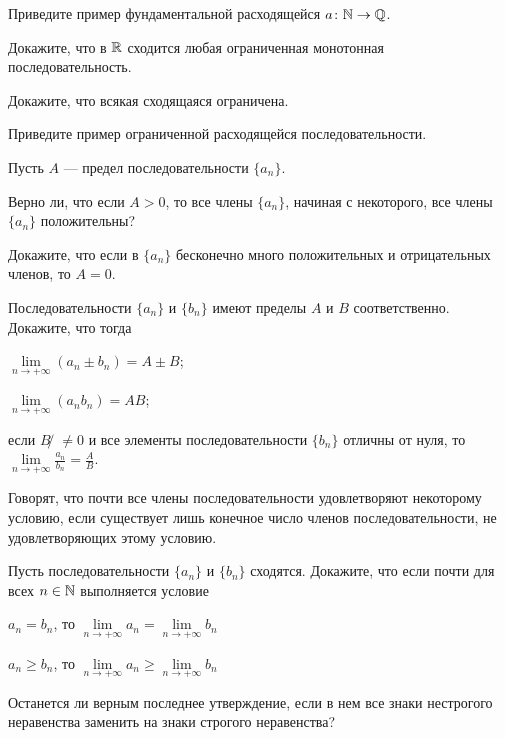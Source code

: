 \documentclass[a4paper, 12pt, num=30]{listok}
\begin{document}
\begin{problem}
    Приведите пример фундаментальной расходящейся $a \colon \mathbb{N} \to \mathbb{Q}$.
\end{problem}
\begin{problem}
    Докажите, что в $\mathbb{R}$ сходится любая ограниченная монотонная последовательность.
\end{problem}
\begin{problem}
    \begin{probparts}
        \item Докажите, что всякая сходящаяся ограничена.
        \item Приведите пример ограниченной расходящейся последовательности.
    \end{probparts}
\end{problem}
\begin{problem}
    Пусть $A$ --- предел последовательности $\{a_n\}$.
    \begin{probparts}
        \item Верно ли, что если $A > 0$, то все члены $\{a_n\}$, начиная с некоторого, все члены $\{a_n\}$ положительны?
        \item Докажите, что если в $\{a_n\}$ бесконечно много положительных и отрицательных членов, то $A = 0$.
    \end{probparts}
\end{problem}
\begin{problem}
    Последовательности $\{a_n\}$ и $\{b_n\}$ имеют пределы $A$ и $B$ соответственно.
    Докажите, что тогда
    \begin{probenum}
        \item $\lim\limits_{n \to +\infty} (a_n \pm b_n) = A \pm B$;
        \item $\lim\limits_{n \to +\infty} (a_n  b_n) = A B$;
        \item если $B ̸\ne 0$ и все элементы последовательности $\{b_n\}$ отличны от нуля, то
            $\lim\limits_{n \to +\infty} \frac{a_n}{b_n} = \frac AB$.
    \end{probenum}
\end{problem}
\begin{definition}
    Говорят, что почти все члены последовательности удовлетворяют некоторому условию,
    если существует лишь конечное число членов последовательности, не удовлетворяющих этому условию.
\end{definition}
\begin{problem}
    Пусть последовательности $\{a_n\}$ и $\{b_n\}$ сходятся.
    Докажите, что если почти для всех $n \in \mathbb{N}$ выполняется условие
    \begin{probparts}
        \item $a_n = b_n$, то $\lim\limits_{n \to +\infty} a_n = \lim\limits_{n \to +\infty} b_n$
        \item $a_n \ge b_n$, то $\lim\limits_{n \to +\infty} a_n \ge \lim\limits_{n \to +\infty} b_n$
        \item Останется ли верным последнее утверждение, если в нем все знаки нестрогого неравенства заменить на знаки строгого неравенства?
    \end{probparts}
\end{problem}
\end{document}
